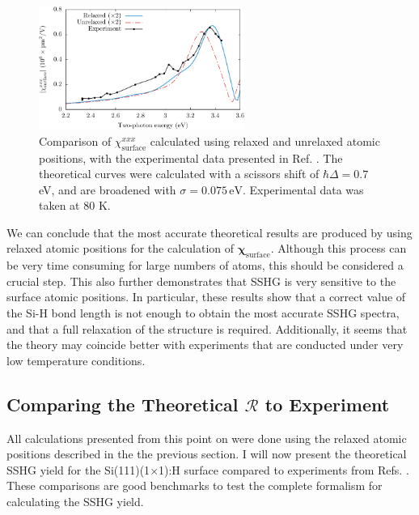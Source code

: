 \begin{figure}[t]
\centering
\includegraphics[width=0.6\textwidth]{content/figures/fig-Si1x1-Hofer_Xxxx}
\caption[$\chi^{xxx}_{\mathrm{surface}}$ calculated using relaxed and unrelaxed
atomic positions.]
{Comparison of $\chi^{xxx}_{\mathrm{surface}}$ calculated using relaxed and
unrelaxed atomic positions, with the experimental data presented in Ref.
\cite{hoferAPA96}. The theoretical curves were calculated with a scissors shift
of $\hbar\Delta = 0.7$ eV, and are broadened with $\sigma=0.075\,\text{eV}$.
Experimental data was taken at 80 K.}
\label{fig:Xxxx}
\end{figure}

We can conclude that the most accurate theoretical results are produced by using
relaxed atomic positions for the calculation of
$\boldsymbol{\chi}_{\mathrm{surface}}$. Although this process can be very time
consuming for large numbers of atoms, this should be considered a crucial step.
This also further demonstrates that SSHG is very sensitive to the surface atomic
positions. In particular, these results show that a correct value of the Si-H
bond length is not enough to obtain the most accurate SSHG spectra, and that a
full relaxation of the structure is required. Additionally, it seems that the
theory may coincide better with experiments that are conducted under very low
temperature conditions.



\subsection{Comparing the Theoretical \texorpdfstring{$\mathcal{R}$}{R} to
Experiment}
\label{sec:1x1sshgyield}

All calculations presented from this point on were done using the relaxed atomic
positions described in the the previous section. I will now present the
theoretical SSHG yield for the Si(111)(1$\times$1):H surface compared to
experiments from Refs. \cite{mitchellSS01, mejiaPRB02, bergfeldPRL04}. These
comparisons are good benchmarks to test the complete formalism for calculating
the SSHG yield.

